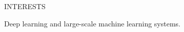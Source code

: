\documentclass{resume} %
\begin{document}





\vspace{-.2in}

\begin{rSection}{INTERESTS}

\vspace{-.2in}
\item[] Deep learning and large-scale machine learning systems.

\end{rSection}
\vspace{-.05in}
\end{document}

